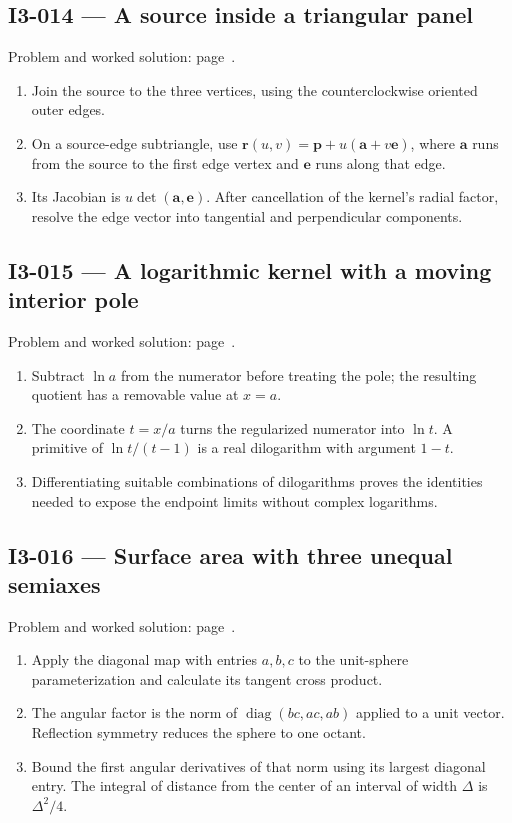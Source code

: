 \documentclass[11pt,oneside,openany]{book}
\begin{document}
\subsection*{I3-014 --- A source inside a triangular panel}
\label{hints:I3-014}
Problem and worked solution: page~\pageref{problem:I3-014}.

\begin{enumerate}
\item Join the source to the three vertices, using the counterclockwise oriented outer edges.
\item On a source-edge subtriangle, use \(\mathbf r(u,v)=\mathbf p+u(\mathbf a+v\mathbf e)\), where \(\mathbf a\) runs from the source to the first edge vertex and \(\mathbf e\) runs along that edge.
\item Its Jacobian is \(u\det(\mathbf a,\mathbf e)\). After cancellation of the kernel's radial factor, resolve the edge vector into tangential and perpendicular components.
\end{enumerate}
\subsection*{I3-015 --- A logarithmic kernel with a moving interior pole}
\label{hints:I3-015}
Problem and worked solution: page~\pageref{problem:I3-015}.

\begin{enumerate}
\item Subtract \(\ln a\) from the numerator before treating the pole; the resulting quotient has a removable value at \(x=a\).
\item The coordinate \(t=x/a\) turns the regularized numerator into \(\ln t\). A primitive of \(\ln t/(t-1)\) is a real dilogarithm with argument \(1-t\).
\item Differentiating suitable combinations of dilogarithms proves the identities needed to expose the endpoint limits without complex logarithms.
\end{enumerate}
\subsection*{I3-016 --- Surface area with three unequal semiaxes}
\label{hints:I3-016}
Problem and worked solution: page~\pageref{problem:I3-016}.

\begin{enumerate}
\item Apply the diagonal map with entries \(a,b,c\) to the unit-sphere parameterization and calculate its tangent cross product.
\item The angular factor is the norm of \(\operatorname{diag}(bc,ac,ab)\) applied to a unit vector. Reflection symmetry reduces the sphere to one octant.
\item Bound the first angular derivatives of that norm using its largest diagonal entry. The integral of distance from the center of an interval of width \(\Delta\) is \(\Delta^2/4\).
\end{enumerate}
\end{document}
